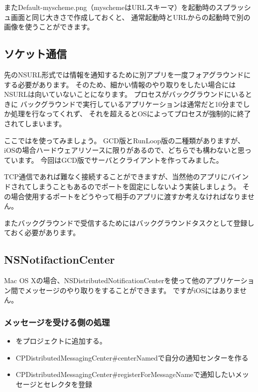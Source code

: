 またDefault-myscheme.png（myschemeはURLスキーマ）を起動時のスプラッシュ画面と同じ大きさで作成しておくと、
通常起動時とURLからの起動時で別の画像を使うことができます。

\subsection{ソケット通信}
先のNSURL形式では情報を通知するために別アプリを一度フォアグラウンドにする必要があります。
そのため、細かい情報のやり取りをしたい場合にはNSURLは向いていないことになります。
プロセスがバックグラウンドにいるときに
バックグラウンドで実行しているアプリケーションは通常だと10分までしか処理を行なってくれず、
それを超えるとOSによってプロセスが強制的に終了されてしまいます。

ここではを使ってみましょう。
GCD版とRunLoop版の二種類がありますが、iOSの場合ハードウェアリソースに限りがあるので、どちらでも構わないと思っています。
今回はGCD版でサーバとクライアントを作ってみました。

TCP通信であれば難なく接続することができますが、当然他のアプリにバインドされてしまうこともあるのでポートを固定にしないよう実装しましょう。
その場合使用するポートをどうやって相手のアプリに渡すか考えなければなりません。

またバックグラウンドで受信するためにはバックグラウンドタスクとして登録しておく必要があります。

\subsection{NSNotifactionCenter}
Mac OS Xの場合、NSDistributedNotificationCenterを使って他のアプリケーション間でメッセージのやり取りをすることができます。
ですがiOSにはありません。
\subsubsection{メッセージを受ける側の処理}
\begin{itemize}
  \item {}をプロジェクトに追加する。
  \item CPDistributedMessagingCenter\#centerNamedで自分の通知センターを作る
  \item CPDistributedMessagingCenter\#registerForMessageNameで通知したいメッセージとセレクタを登録
\end{itemize}

